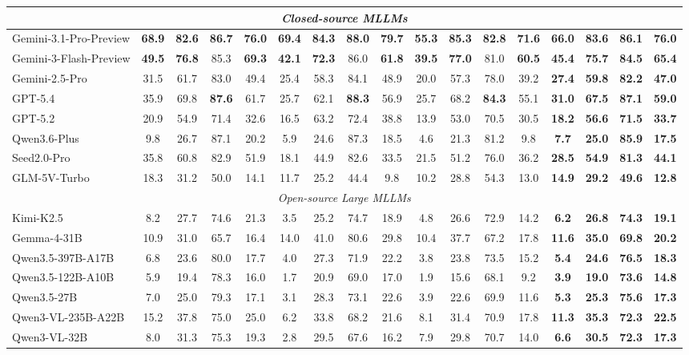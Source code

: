 \documentclass[]{opendatalab}
\newcommand{\highlightgreen}[1]{\colorbox[HTML]{d3ff9f}{\textbf{#1}}}
\newcommand{\highlightblue}[1]{\colorbox[HTML]{bae6fb}{\textbf{#1}}}
\begin{document}
{\begin{table}[t]
\begin{tabular}{@{}l cccc cccc cccc >{\bfseries}c>{\bfseries}c>{\bfseries}c>{\bfseries}c@{}}
\multicolumn{17}{c}{\textit{Closed-source MLLMs}} \\ \midrule
Gemini-3.1-Pro-Preview&\highlightblue{68.9}&\highlightblue{82.6}&\highlightgreen{86.7}&\highlightblue{76.0}&\highlightblue{69.4}&\highlightblue{84.3}&\highlightgreen{88.0}&\highlightblue{79.7}&\highlightblue{55.3}&\highlightblue{85.3}&\highlightgreen{82.8}&\highlightblue{71.6}&\highlightblue{66.0}&\highlightblue{83.6}&\highlightgreen{86.1}&\highlightblue{76.0} \\
Gemini-3-Flash-Preview&\highlightgreen{49.5}&\highlightgreen{76.8}&85.3&\highlightgreen{69.3}&\highlightgreen{42.1}&\highlightgreen{72.3}&86.0&\highlightgreen{61.8}&\highlightgreen{39.5}&\highlightgreen{77.0}&81.0&\highlightgreen{60.5}&\highlightgreen{45.4}&\highlightgreen{75.7}&84.5&\highlightgreen{65.4} \\
Gemini-2.5-Pro&31.5&61.7&83.0&49.4&25.4&58.3&84.1&48.9&20.0&57.3&78.0&39.2&27.4&59.8&82.2&47.0\\
GPT-5.4&35.9&69.8&\highlightblue{87.6}&61.7&25.7&62.1&\highlightblue{88.3}&56.9&25.7&68.2&\highlightblue{84.3}&55.1&31.0&67.5&\highlightblue{87.1}&59.0\\
GPT-5.2 &20.9&54.9&71.4&32.6&16.5&63.2&72.4&38.8&13.9&53.0&70.5&30.5&18.2&56.6&71.5&33.7 \\
Qwen3.6-Plus&9.8&26.7&87.1&20.2&5.9&24.6&87.3&18.5&4.6&21.3&81.2&9.8&7.7&25.0&85.9&17.5\\
Seed2.0-Pro&35.8&60.8&82.9&51.9&18.1&44.9&82.6&33.5&21.5&51.2&76.0&36.2&28.5&54.9&81.3&44.1 \\
GLM-5V-Turbo &18.3&31.2&50.0&14.1&11.7&25.2&44.4&9.8&10.2&28.8&54.3&13.0&14.9&29.2&49.6&12.8\\
\midrule

\multicolumn{17}{c}{\textit{Open-source Large MLLMs}} \\ \midrule
Kimi-K2.5&8.2&27.7&74.6&21.3&3.5&25.2&74.7&18.9&4.8&26.6&72.9&14.2&6.2&26.8&74.3&19.1 \\
Gemma-4-31B &10.9&31.0&65.7&16.4&14.0&41.0&80.6&29.8&10.4&37.7&67.2&17.8&11.6&35.0&69.8&20.2\\
Qwen3.5-397B-A17B&6.8&23.6&80.0&17.7&4.0&27.3&71.9&22.2&3.8&23.8&73.5&15.2&5.4&24.6&76.5&18.3\\
Qwen3.5-122B-A10B&5.9&19.4&78.3&16.0&1.7&20.9&69.0&17.0&1.9&15.6&68.1&9.2&3.9&19.0&73.6&14.8 \\
Qwen3.5-27B &7.0&25.0&79.3&17.1&3.1&28.3&73.1&22.6&3.9&22.6&69.9&11.6&5.3&25.3&75.6&17.3\\
Qwen3-VL-235B-A22B&15.2&37.8&75.0&25.0&6.2&33.8&68.2&21.6&8.1&31.4&70.9&17.8&11.3&35.3&72.3&22.5 \\
Qwen3-VL-32B&8.0&31.3&75.3&19.3&2.8&29.5&67.6&16.2&7.9&29.8&70.7&14.0&6.6&30.5&72.3&17.3 \\
\midrule


\end{tabular}
\end{table}}
\end{document}

